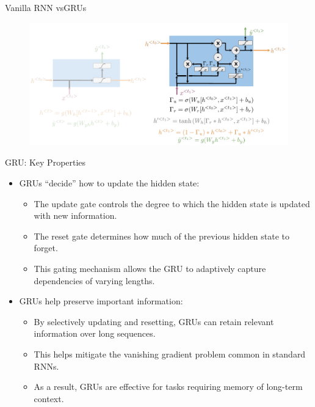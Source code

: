 \begin{frame}[allowframebreaks]{Vanilla RNN vsGRUs}
    \begin{figure}
        \centering
        \includegraphics[width=\linewidth, height=0.9\textheight,keepaspectratio]{images/nlp/vanilla-rnn-vs-gru.png}
    \end{figure}
\end{frame}

\begin{frame}[allowframebreaks]{GRU: Key Properties}
    \begin{itemize}
        \item GRUs “decide” how to update the hidden state:
        \begin{itemize}
            \item The update gate controls the degree to which the hidden state is updated with new information.
            \item The reset gate determines how much of the previous hidden state to forget.
            \item This gating mechanism allows the GRU to adaptively capture dependencies of varying lengths.
        \end{itemize}
        \framebreak
        \item GRUs help preserve important information:
        \begin{itemize}
            \item By selectively updating and resetting, GRUs can retain relevant information over long sequences.
            \item This helps mitigate the vanishing gradient problem common in standard RNNs.
            \item As a result, GRUs are effective for tasks requiring memory of long-term context.
        \end{itemize}
    \end{itemize}
\end{frame}

